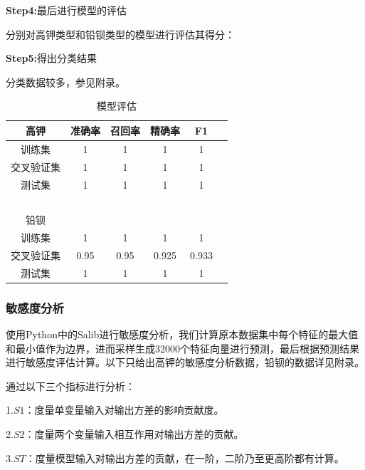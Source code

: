 \documentclass[UTF8]{ctexart}
\begin{document}
        \textbf{Step4:}最后进行模型的评估

        分别对高钾类型和铅钡类型的模型进行评估其得分：

        \textbf{Step5:}得出分类结果

        分类数据较多，参见附录。

        \begin{table}[H]
            \centering
            \caption{模型评估}
            \begin{tabular}{|c|c|c|c|c|c|}
                \hline
                高钾       & 准确率 & 召回率 & 精确率 & F1    \\ \hline
                训练集     & 1      & 1      & 1      & 1     \\ \hline
                交叉验证集 & 1      & 1      & 1      & 1     \\ \hline
                测试集     & 1      & 1      & 1      & 1     \\ \hline
                ~          & ~      & ~      & ~      & ~     \\ \hline
                铅钡       & ~      & ~      & ~      & ~     \\ \hline
                训练集     & 1      & 1      & 1      & 1     \\ \hline
                交叉验证集 & 0.95   & 0.95   & 0.925  & 0.933 \\ \hline
                测试集     & 1      & 1      & 1      & 1     \\ \hline
            \end{tabular}
        \end{table}


        \subsubsection{敏感度分析}
        使用Python中的Salib进行敏感度分析，我们计算原本数据集中每个特征的最大值和最小值作为边界，进而采样生成32000个特征向量进行预测，最后根据预测结果进行敏感度评估计算。以下只给出高钾的敏感度分析数据，铅钡的数据详见附录。

        通过以下三个指标进行分析：

        1.$S1$：度量单变量输入对输出方差的影响贡献度。

        2.$S2$：度量两个变量输入相互作用对输出方差的贡献。

        3.$ST$：度量模型输入对输出方差的贡献，在一阶，二阶乃至更高阶都有计算。

\end{document}
